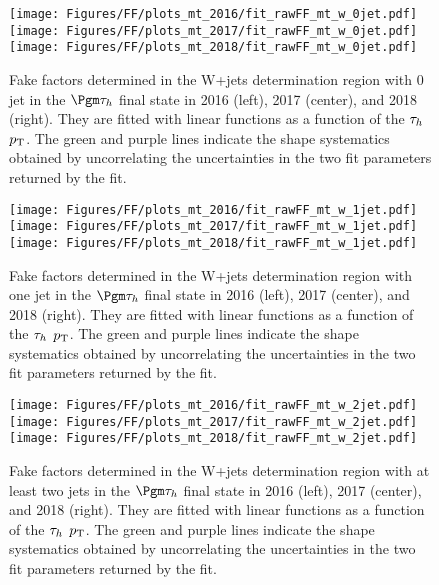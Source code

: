\begin{figure}[ht!b]
\centering
\texttt{[image: Figures/FF/plots\_mt\_2016/fit\_rawFF\_mt\_w\_0jet.pdf]}
\texttt{[image: Figures/FF/plots\_mt\_2017/fit\_rawFF\_mt\_w\_0jet.pdf]}
\texttt{[image: Figures/FF/plots\_mt\_2018/fit\_rawFF\_mt\_w\_0jet.pdf]}\\
\caption{\label{fig:fit_raw_mt_0jet_w} Fake factors determined in the W+jets determination region with 0 jet in the $\Pgm\tauh$ final state in 2016 (left), 2017 (center), and 2018 (right). They are fitted with linear functions as a function of the $\tau_h$ $p_{\mathrm{T}}$. The green and purple lines indicate the shape systematics obtained by uncorrelating the uncertainties in the two fit parameters returned by the fit.  }
\end{figure}

\begin{figure}[ht!b]
\centering
\texttt{[image: Figures/FF/plots\_mt\_2016/fit\_rawFF\_mt\_w\_1jet.pdf]}
\texttt{[image: Figures/FF/plots\_mt\_2017/fit\_rawFF\_mt\_w\_1jet.pdf]}
\texttt{[image: Figures/FF/plots\_mt\_2018/fit\_rawFF\_mt\_w\_1jet.pdf]}\\
\caption{\label{fig:fit_raw_mt_1jet_w} Fake factors determined in the W+jets determination region with one jet in the $\Pgm\tauh$ final state in 2016 (left), 2017 (center), and 2018 (right). They are fitted with linear functions as a function of the $\tau_h$ $p_{\mathrm{T}}$. The green and purple lines indicate the shape systematics obtained by uncorrelating the uncertainties in the two fit parameters returned by the fit.  }
\end{figure}

\begin{figure}[ht!b]
\centering
\texttt{[image: Figures/FF/plots\_mt\_2016/fit\_rawFF\_mt\_w\_2jet.pdf]}
\texttt{[image: Figures/FF/plots\_mt\_2017/fit\_rawFF\_mt\_w\_2jet.pdf]}
\texttt{[image: Figures/FF/plots\_mt\_2018/fit\_rawFF\_mt\_w\_2jet.pdf]}\\
\caption{\label{fig:fit_raw_mt_2jet_w} Fake factors determined in the W+jets determination region with at least two jets in the $\Pgm\tauh$ final state in 2016 (left), 2017 (center), and 2018 (right). They are fitted with linear functions as a function of the $\tau_h$ $p_{\mathrm{T}}$. The green and purple lines indicate the shape systematics obtained by uncorrelating the uncertainties in the two fit parameters returned by the fit.  }
\end{figure}

